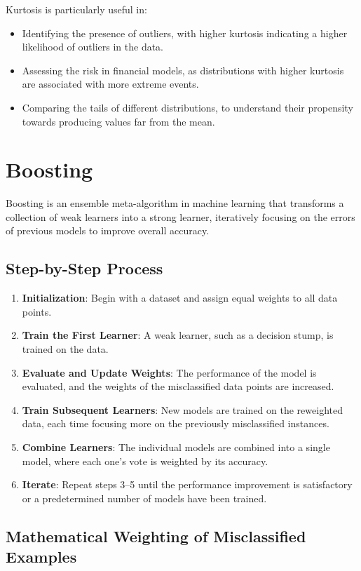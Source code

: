 \documentclass[12pt]{article}
\begin{document}
Kurtosis is particularly useful in:
\begin{itemize}
    \item Identifying the presence of outliers, with higher kurtosis indicating a higher likelihood of outliers in the data.
    \item Assessing the risk in financial models, as distributions with higher kurtosis are associated with more extreme events.
    \item Comparing the tails of different distributions, to understand their propensity towards producing values far from the mean.
\end{itemize}
\section{Boosting}

Boosting is an ensemble meta-algorithm in machine learning that transforms a collection of weak learners into a strong learner, iteratively focusing on the errors of previous models to improve overall accuracy.

\subsection{Step-by-Step Process}

\begin{enumerate}
    \item \textbf{Initialization}: Begin with a dataset and assign equal weights to all data points.
    \item \textbf{Train the First Learner}: A weak learner, such as a decision stump, is trained on the data.
    \item \textbf{Evaluate and Update Weights}: The performance of the model is evaluated, and the weights of the misclassified data points are increased.
    \item \textbf{Train Subsequent Learners}: New models are trained on the reweighted data, each time focusing more on the previously misclassified instances.
    \item \textbf{Combine Learners}: The individual models are combined into a single model, where each one's vote is weighted by its accuracy.
    \item \textbf{Iterate}: Repeat steps 3–5 until the performance improvement is satisfactory or a predetermined number of models have been trained.
\end{enumerate}

\subsection{Mathematical Weighting of Misclassified Examples}
\end{document}
